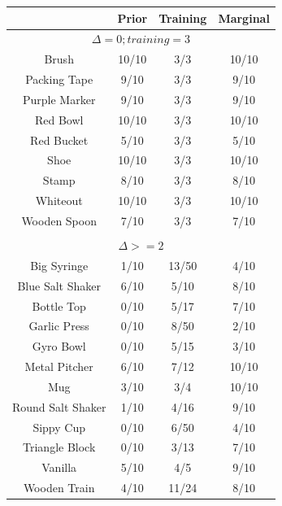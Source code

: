 \documentclass{article}
\begin{document}
\begin{table}
\small
\begin{tabular}{cccc}
\toprule
		    & Prior         &  Training     & Marginal\\
\midrule
\multicolumn{4}{c}{$\Delta = 0; training = 3$} \\
\midrule
Brush    	    & 10/10         &  3/3         &  10/10\\
Packing Tape        & 9/10          &  3/3         &  9/10 \\
Purple Marker       & 9/10          &  3/3         &  9/10 \\
Red Bowl    	    & 10/10         &  3/3         &  10/10\\
Red Bucket    	    & 5/10          &  3/3         &  5/10 \\
Shoe    	    & 10/10         &  3/3         &  10/10\\
Stamp    	    & 8/10          &  3/3         &  8/10 \\
Whiteout    	    & 10/10         &  3/3         &  10/10\\
Wooden Spoon        & 7/10          &  3/3         &  7/10 \\
\midrule
\\
\multicolumn{4}{c}{$\Delta >= 2$} \\
\midrule
Big Syringe    	    & 1/10          &  13/50       &  4/10 \\
Blue Salt Shaker    & 6/10          &  5/10        &  8/10 \\
Bottle Top    	    & 0/10          &  5/17        &  7/10 \\
Garlic Press        & 0/10          &  8/50        &  2/10 \\
Gyro Bowl    	    & 0/10          &  5/15        &  3/10 \\
Metal Pitcher       & 6/10          &  7/12        &  10/10\\
Mug    		    & 3/10          &  3/4         &  10/10\\
Round Salt Shaker   & 1/10          &  4/16        &  9/10 \\
Sippy Cup    	    & 0/10          &  6/50        &  4/10 \\
Triangle Block      & 0/10          &  3/13        &  7/10 \\
Vanilla	   	    & 5/10          &  4/5         &  9/10 \\
Wooden Train        & 4/10          &  11/24       &  8/10 \\


\end{tabular}
\end{table}
\end{document}
